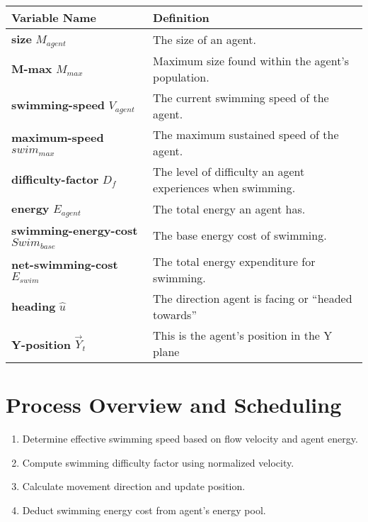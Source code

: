 \documentclass[
]{book}
\begin{document}
\begin{longtable}[]{@{}
  >{\centering\arraybackslash}p{}
  >{\centering\arraybackslash}p{}@{}}
\toprule\noalign{}
\begin{minipage}[b]{\linewidth}\centering
Variable Name
\end{minipage} & \begin{minipage}[b]{\linewidth}\centering
Definition
\end{minipage} \\
\midrule\noalign{}
\endhead
\bottomrule\noalign{}
\endlastfoot
\textbf{size} \(M_{agent}\) & The size of an agent. \\
\textbf{M-max} \(M_{max}\) & Maximum size found within the agent's population. \\
\textbf{swimming-speed} \(V_{agent}\) & The current swimming speed of the agent. \\
\textbf{maximum-speed} \(swim_{max}\) & The maximum sustained speed of the agent. \\
\textbf{difficulty-factor} \(D_{f}\) & The level of difficulty an agent experiences when swimming. \\
\textbf{energy} \(E_{agent}\) & The total energy an agent has. \\
\textbf{swimming-energy-cost} \(Swim_{base}\) & The base energy cost of swimming. \\
\textbf{net-swimming-cost} \(E_{swim}\) & The total energy expenditure for swimming. \\
\textbf{heading} \(\hat{u}\) & The direction agent is facing or ``headed towards'' \\
\textbf{Y-position} \(\vec{Y}_t\) & This is the agent's position in the Y plane \\
\end{longtable}

\section{Process Overview and Scheduling}\label{process-overview-and-scheduling-2}

\begin{enumerate}
\def\labelenumi{\arabic{enumi}.}
\item
  Determine effective swimming speed based on flow velocity and agent energy.
\item
  Compute swimming difficulty factor using normalized velocity.
\item
  Calculate movement direction and update position.
\item
  Deduct swimming energy cost from agent's energy pool.
\end{enumerate}
\end{document}
